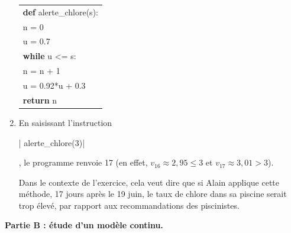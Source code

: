 \begin{enumerate}
	\begin{center}
	\begin{tabular}{|l|}\hline
		\textbf{def} alerte\_chlore(s):\\
		\qquad n = 0\\
		\qquad u = 0.7\\
		\qquad \textbf{while} u <= s:\\
		\qquad \qquad n = n + 1 \\
		\qquad \qquad u = 0.92*u + 0.3\\
		\qquad \textbf{return} n\\ \hline
	\end{tabular}
\end{center}

	\item En saisissant l'instruction {\begin{Verb}| alerte_chlore(3)|\end{Verb}}, le programme renvoie 17 (en effet, $v_{16}\approx 2,95 \leqslant 3$ et $v_{17} \approx 3,01 > 3$).

Dans le contexte de l'exercice, cela veut dire que si Alain applique cette méthode, 17 jours après le 19 juin, le taux de chlore dans sa piscine serait trop élevé, par rapport aux recommandations des piscinistes.
\end{enumerate}

\medskip

\textbf{Partie B : étude d'un modèle continu.}

\smallskip

